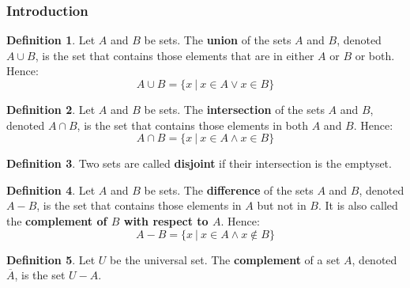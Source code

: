 \documentclass[article, 11pt]{article}
\theoremstyle{definition}
\newtheorem{definition}{Definition}[section]
\newcommand{\unite}{\cup}
\newcommand{\inter}{\cap}
\begin{document}
    \subsubsection{Introduction}
    \begin{definition}
        Let $A$ and $B$ be sets. The \textbf{union} of the sets $A$ and $B$, denoted $A \unite B$, is the set that contains those elements that are in either $A$ or $B$ or both. Hence:
        \begin{equation*}
            A \unite B = \{x \ | \ x \in A \lor x \in B\}
        \end{equation*}
    \end{definition}
    \begin{definition}
        Let $A$ and $B$ be sets. The \textbf{intersection} of the sets $A$ and $B$, denoted $A \inter B$, is the set that contains those elements in both $A$ and $B$. Hence:
        \begin{equation*}
            A \inter B = \{x \ | \ x \in A \land x \in B\}
        \end{equation*}
    \end{definition}
    \begin{definition}
        Two sets are called \textbf{disjoint} if their intersection is the emptyset.
    \end{definition}
    \begin{definition}
        Let $A$ and $B$ be sets. The \textbf{difference} of the sets $A$ and $B$, denoted $A - B$, is the set that contains those elements in $A$ but not in $B$. It is also called the \textbf{complement of $B$ with respect to $A$}. Hence:
        \begin{equation*}
            A - B = \{x \ | \ x \in A \land x \not\in B\}
        \end{equation*}
    \end{definition}
    \begin{definition}
        Let $U$ be the universal set. The \textbf{complement} of a set $A$, denoted $\overline{A}$, is the set $U - A$.
    \end{definition}
\end{document}
